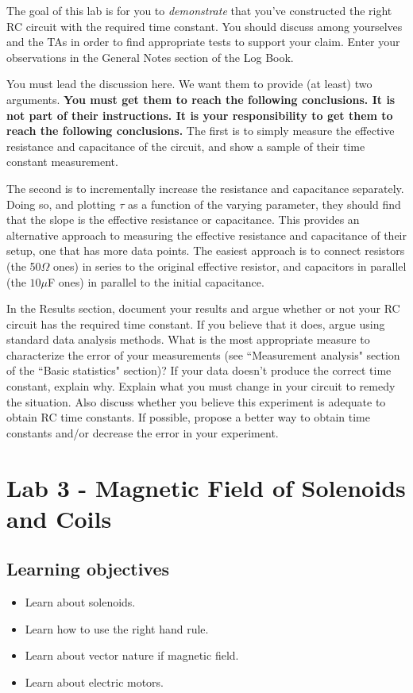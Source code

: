 \documentclass[12pt]{report}
\begin{document}
{\color{blue}The goal of this lab is for you to \textit{demonstrate} that you've constructed the right RC circuit with the required time constant. 
You should discuss among yourselves and the TAs in order to find appropriate tests to support your claim. Enter your observations in the General Notes section of the Log Book.}

\begin{tcolorbox}
You must lead the discussion here. We want them to provide (at least) two arguments. \textbf{You must get them to reach the following conclusions. It is not part of their instructions. It is your responsibility to get them to reach the following conclusions.} The first is to simply measure the effective resistance and capacitance of the circuit, and show a sample of their time constant measurement.
\end{tcolorbox}
\begin{tcolorbox}
The second is to incrementally increase the resistance and capacitance separately. 
Doing so, and plotting $\tau$ as a function of the varying parameter, they should find that the slope is the effective resistance or capacitance.
This provides an alternative approach to measuring the effective resistance and capacitance of their setup, one that has more data points. The easiest approach is to connect resistors (the 50$\Omega$ ones) in series to the original effective resistor, and capacitors in parallel (the $10\mu$F ones) in parallel to the initial capacitance.
\end{tcolorbox}

{\color{blue} In the Results section,  document your results and argue whether or not your RC circuit has the required time constant. If you believe that it does, argue using standard data analysis methods. What is the most appropriate measure to characterize the error of your measurements (see ``Measurement analysis" section of the ``Basic statistics" section)? If your data doesn't produce the correct time constant, explain why. Explain what you must change in your circuit to remedy the situation. Also discuss whether you believe this experiment is adequate to obtain RC time constants. If possible, propose a better way to obtain time constants and/or decrease the error in your experiment.}


\chapter{Lab 3 - Magnetic Field of Solenoids and Coils}
\section{Learning objectives}
\begin{itemize}
\item Learn about solenoids.
\item Learn how to use the right hand rule.
\item Learn about vector nature if magnetic field.
\item Learn about electric motors.
\end{itemize}
\end{document}
